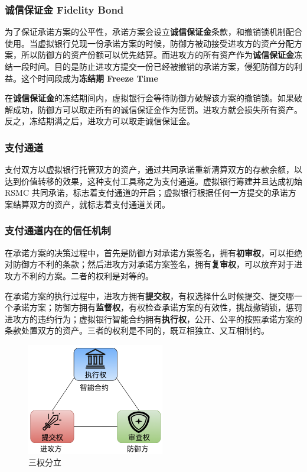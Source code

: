 \subsubsection{诚信保证金 Fidelity Bond}
为了保证承诺方案的公平性，承诺方案会设立\textbf{诚信保证金}条款，和撤销锁机制配合使用。当虚拟银行兑现一份承诺方案的时候，防御方被动接受进攻方的资产分配方案，所以防御方的资产份额可以优先结算。而进攻方的所有资产作为\textbf{诚信保证金}冻结一段时间。目的是防止进攻方提交一份已经被撤销的承诺方案，侵犯防御方的利益。这个时间段成为\textbf{冻结期 Freeze Time}

在\textbf{诚信保证金}的冻结期间内，虚拟银行会等待防御方破解该方案的撤销锁。如果破解成功，防御方可以取走所有的诚信保证金作为惩罚。进攻方就会损失所有资产。反之，冻结期满之后，进攻方可以取走诚信保证金。

\subsubsection{支付通道}
支付双方以虚拟银行托管双方的资产，通过共同承诺重新清算双方的存款余额，以达到价值转移的效果，这种支付工具称之为支付通道。虚拟银行筹建并且达成初始 RSMC 共同承诺，标志着支付通道的开启；虚拟银行根据任何一方提交的承诺方案结算双方的资产，就标志着支付通道关闭。

\subsubsection{支付通道内在的信任机制}
在承诺方案的决策过程中，首先是防御方对承诺方案签名，拥有\textbf{初审权}，可以拒绝对防御方不利的条款；然后进攻方对承诺方案签名，拥有\textbf{复审权}，可以放弃对于进攻方不利的方案。二者的权利是对等的。

在承诺方案的执行过程中，进攻方拥有\textbf{提交权}，有权选择什么时候提交、提交哪一个承诺方案；防御方拥有\textbf{监督权}，有权检查承诺方案的有效性，挑战撤销锁，惩罚进攻方的违约行为；虚拟银行智能合约拥有\textbf{执行权}，公开、公平的按照承诺方案的条款处置双方的资产。三者的权利是不同的，既互相独立、又互相制约。

\begin{figure}[h!]
    \centering
    \includegraphics[width=6cm, keepaspectratio]{../images/trias.png}
    \caption{三权分立}
    \label{fig:trias}
\end{figure}

